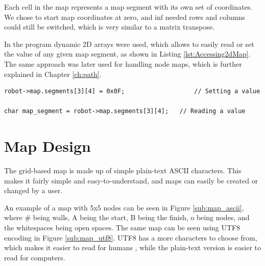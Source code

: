 Each cell in the map represents a map segment with its own set of coordinates. 
We chose to start map coordinates at zero, and inf needed rows and columns could still be switched, 
which is very similar to a matrix transpose. 

In the program dynamic 2D arrays were used, 
which allows to easily read or set the value of any given map segment, as shown in Listing \ref{lst:Accessing2dMap}.
The same approach was later used for handling node maps, which is further explained in Chapter \ref{ch:path}.
 
\begin{lstlisting}[caption={Example of reading or setting a value for coordinate (3,4) in the 2D map array, using structs and pointers. Structs are declared in {\tt defs.h} in Appendix \ref{app:defs.h}},label={lst:Accessing2dMap}]
robot->map.segments[3][4] = 0x0F;					// Setting a value

char map_segment = robot->map.segments[3][4];	// Reading a value

\end{lstlisting}
\section{Map Design}
\label{sec:map_design} %
The grid-based map is made up of simple plain-text ASCII characters.
This makes it fairly simple and easy-to-understand, and maps can easily be created or changed by a user. 

An example of a map with 5x5 nodes can be seen in Figure \ref{sub:map_ascii}, 
where \# being walls, A being the start, B being the finish, o being nodes, and the whitespaces being open spaces. 
The same map can be seen using UTF8 encoding in Figure \ref{sub:map_utf8}. 
UTF8 has a more characters to choose from, which makes it easier to read for humans , 
while the plain-text version is easier to read for computers.


